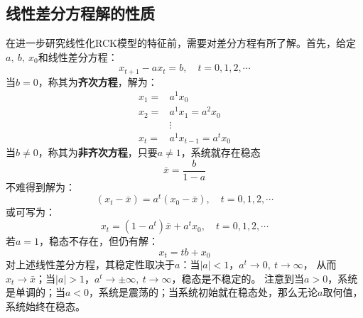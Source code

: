 \subsection{线性差分方程解的性质}

在进一步研究线性化RCK模型的特征前，需要对差分方程有所了解。首先，给定$a,~b,~x_0$和线性差分方程：
\begin{equation*}
    x_{t+1} - ax_t = b, \quad t=0,1,2,\cdots
\end{equation*}
当$b=0$，称其为\textbf{齐次方程}，解为：
\begin{equation*}
    \begin{aligned}
        x_1= & a^1 x_0 \\
        x_2= & a^1 x_1=a^2 x_0 \\
        & \vdots \\
        x_t= & a^1 x_{t-1}=a^t x_0
    \end{aligned}
\end{equation*}
当$b\neq0$，称其为\textbf{非齐次方程}，只要$a\neq 1$，系统就存在稳态
\begin{equation*}
    \bar{x} = \frac{b}{1-a}
\end{equation*}
不难得到解为：
\begin{equation*}
    \left(x_t-\bar{x}\right)=a^t\left(x_0-\bar{x}\right), \quad t=0,1,2, \cdots
\end{equation*}
或可写为：
\begin{equation*}
    x_t=\left(1-a^t\right) \bar{x}+a^t x_0, \quad t=0,1,2, \cdots
\end{equation*}
若$a=1$，稳态不存在，但仍有解：
\begin{equation*}
    x_t = tb + x_0
\end{equation*}
对上述线性差分方程，其稳定性取决于$a$：当$|a|<1$，$a^t\rightarrow 0,~t\rightarrow \infty$，
从而$x_t\rightarrow \bar{x}$；当$|a|>1$，$a^t \rightarrow \pm \infty,~t\rightarrow \infty$，稳态是不稳定的。
注意到当$a>0$，系统是单调的；当$a<0$，系统是震荡的；当系统初始就在稳态处，那么无论$a$取何值，系统始终在稳态。

